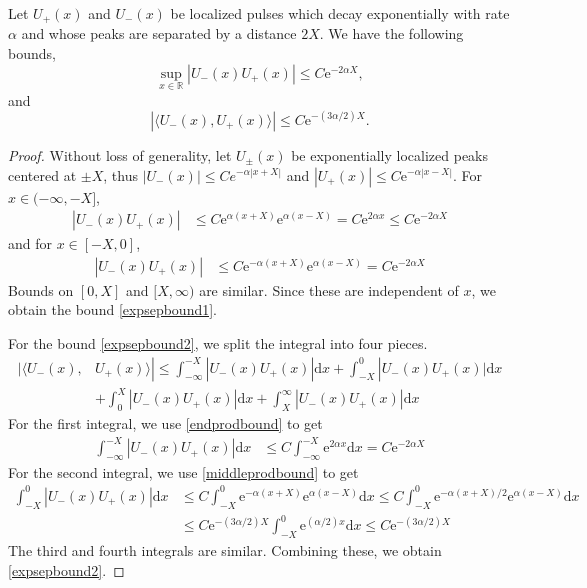 \documentclass[review,onefignum,onetabnum]{siamart171218}
\newcommand{\R}{\mathbb{R}}
\newcommand{\rmd}{\mathrm{d}}
\newcommand{\rme}{\mathrm{e}}
\begin{document}
\begin{lemma}\label{expseplemma}
Let $U_+(x)$ and $U_-(x)$ be localized pulses which decay exponentially with rate $\alpha$ and whose peaks are separated by a distance $2 X$. We have the following bounds,
\begin{equation}\label{expsepbound1}
\sup_{x \in \R} | U_-(x) U_+(x)|\leq C \rme^{-2 \alpha X},
\end{equation}
and
\begin{equation}\label{expsepbound2}
|\langle U_-(x), U_+(x) \rangle |\leq C \rme^{-(3 \alpha/2) X}.
\end{equation}
\begin{proof}
Without loss of generality, let $U_\pm(x)$ be exponentially localized peaks centered at $\pm X$, thus $|U_-(x)| \leq C e^{-\alpha|x + X|}$ and $|U_+(x)| \leq C \rme^{-\alpha|x - X|}$. For $x \in (-\infty, -X]$,
\begin{align}\label{endprodbound}
| U_-(x) U_+(x) | &\leq C \rme^{\alpha(x + X)} \rme^{\alpha(x - X)} = C \rme^{2 \alpha x} \leq C \rme^{-2 \alpha X}
\end{align}
and for $x \in [-X, 0]$,
\begin{align}\label{middleprodbound}
| U_-(x) U_+(x) | &\leq C \rme^{-\alpha(x + X)} \rme^{\alpha(x - X)} = C \rme^{-2 \alpha X}
\end{align}
Bounds on $[0, X]$ and $[X, \infty)$ are similar. Since these are independent of $x$, we obtain the bound \cref{expsepbound1}.

For the bound \cref{expsepbound2}, we split the integral into four pieces.
\begin{equation}
\begin{aligned}
| \langle U_-(x), &U_+(x) \rangle |
\leq \int_{-\infty}^{-X} |U_-(x) U_+(x)| \rmd x + \int_{-X}^0 |U_-(x) U_+(x)|\rmd x \\
&+\int_0^X |U_-(x) U_+(x)| \rmd x +\int_X^\infty |U_-(x) U_+(x)| \rmd x
\end{aligned}
\end{equation}
For the first integral, we use \cref{endprodbound} to get
\begin{align*}
\int_{-\infty}^{-X} |U_-(x) U_+(x)| \rmd x &\leq C \int_{-\infty}^{-X} \rme^{2 \alpha x} \rmd x = C \rme^{-2 \alpha X}
\end{align*}
For the second integral, we use \cref{middleprodbound} to get
\begin{align*}
\int_{-X}^0 |U_-(x) U_+(x)| \rmd x &\leq C \int_{-X}^0 \rme^{-\alpha(x + X)} \rme^{\alpha(x - X)} \rmd x \leq C \int_{-X}^0 \rme^{-\alpha(x + X)/2}\rme^{\alpha(x - X)} \rmd x \\
&\leq C \rme^{-(3 \alpha/2) X } \int_{-X}^0 \rme^{(\alpha/2)x} \rmd x \leq C \rme^{-(3 \alpha/2) X }
\end{align*}
The third and fourth integrals are similar. Combining these, we obtain \cref{expsepbound2}.
\end{proof}
\end{lemma}
\end{document}
